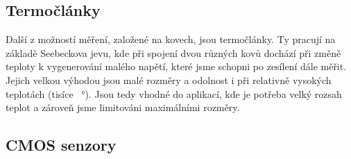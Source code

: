 \subsection{Termočlánky}

Další z možností měření, založené na kovech, jsou termočlánky. Ty pracují na základě Seebeckova jevu, kde při spojení dvou různých kovů dochází při změně teploty k vygenerování malého napětí, které jsme schopni po zesílení dále měřit. Jejich velkou výhodou jsou malé rozměry a odolnost i při relativně vysokých teplotách (tisíce \SI{}{\degree}). Jsou tedy vhodné do aplikací, kde je potřeba velký rozsah teplot a zároveň jsme limitováni maximálními rozměry.

\subsection{CMOS senzory}

